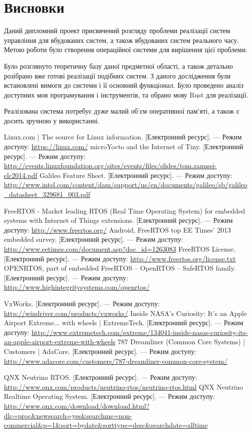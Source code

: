 \documentclass[oneside,14pt,a4paper,final]{myextreport}
\newcommand{\eresource}[2]{#1. [Електронний ресурс]. --- Режим доступу: \url{#2}}
\newcommand{\specialchapter}[1]{\chapter*{#1}\addcontentsline{toc}{chapter}{#1}}
\begin{document}
\specialchapter{Висновки}

Даний дипломний проект присвячений розгляду проблеми реалізації систем управління для вбудованих систем, а також вбудованих систем реального часу. Метою роботи було створення операційної системи для вирішення цієї проблеми.

Було розглянуто теоретичну базу даної предметної області, а також детально розібрано вже готові реалізації подібних систем. З даного дослідження були встановлені вимоги до системи і її основний функціонал. Було проведено аналіз доступних мов програмування і інструментів, та обрано мову Rust для реалізації.

Реалізована система потребує дуже малий об'єм оперативної пам'яті, а також є досить зручною у використанні.

\begin{thebibliography}{00}
    \eresource{Linux.com | The source for Linux information}{https://linux.com/}
    \eresource{microYocto and the Internet of Tiny}{http://events.linuxfoundation.org/sites/events/files/slides/tom.zanussi-elc2014.pdf}
    \eresource{Galileo Feature Sheet}{http://www.intel.com/content/dam/support/us/en/documents/galileo/sb/galileo\_datasheet\_329681\_003.pdf}

    \eresource{FreeRTOS - Market leading RTOS (Real Time Operating System) for embedded systems with Internet of Things extensions}{http://www.freertos.org/}
    \eresource{Android, FreeRTOS top EE Times' 2013 embedded survey}{http://www.eetimes.com/document.asp?doc\_id=1263083}
    \eresource{FreeRTOS License}{http://www.freertos.org/license.txt}
    \eresource{OPENRTOS, part of embedded FreeRTOS -- OpenRTOS -- SafeRTOS family}{http://www.highintegritysystems.com/openrtos/}

    \eresource{VxWorks}{http://windriver.com/products/vxworks/}
    \eresource{Inside NASA's Curiosity: It's an Apple Airport Extreme... with wheels | ExtremeTech}{http://www.extremetech.com/extreme/134041-inside-nasas-curiosity-its-an-apple-airport-extreme-with-wheels}
    \eresource{787 Dreamliner (Common Core Systems) | Customers | AdaCore}{http://www.adacore.com/customers/787-dreamliner-common-core-system/}

    \eresource{QNX Neutrino RTOS}{http://www.qnx.com/products/neutrino-rtos/neutrino-rtos.html}
    \eresource{QNX Neutrino Realtime Operating System}{http://www.qnx.com/download/download.html?dlc=proc&newsearch=yes&searchme=non-commercial&p=1&sort=bydate&sorttype=desc&searchdate=alltime}


\end{thebibliography}
\end{document}
